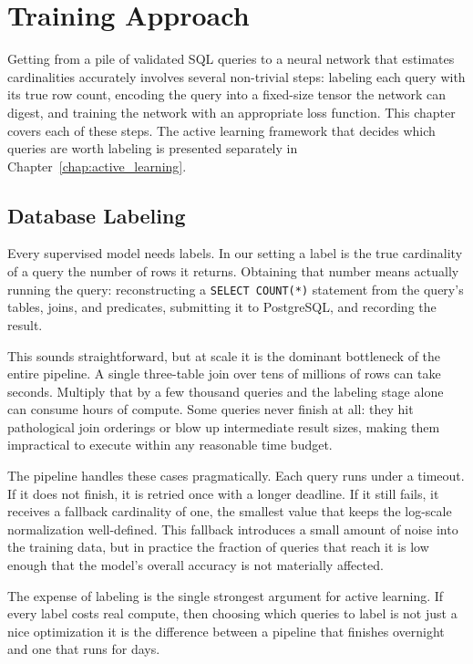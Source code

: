 \chapter{Training Approach}
\label{chap:training_approach}
\pagestyle{plain}

Getting from a pile of validated SQL queries to a neural network that estimates cardinalities accurately involves several non-trivial steps: labeling each query with its true row count, encoding the query into a fixed-size tensor the network can digest, and training the network with an appropriate loss function. This chapter covers each of these steps. The active learning framework that decides which queries are worth labeling is presented separately in Chapter~\ref{chap:active_learning}.


\section{Database Labeling}

Every supervised model needs labels. In our setting a label is the true cardinality of a query the number of rows it returns. Obtaining that number means actually running the query: reconstructing a \texttt{SELECT COUNT(*)} statement from the query's tables, joins, and predicates, submitting it to PostgreSQL, and recording the result.

This sounds straightforward, but at scale it is the dominant bottleneck of the entire pipeline. A single three-table join over tens of millions of rows can take seconds. Multiply that by a few thousand queries and the labeling stage alone can consume hours of compute. Some queries never finish at all: they hit pathological join orderings or blow up intermediate result sizes, making them impractical to execute within any reasonable time budget.

The pipeline handles these cases pragmatically. Each query runs under a timeout. If it does not finish, it is retried once with a longer deadline. If it still fails, it receives a fallback cardinality of one, the smallest value that keeps the log-scale normalization well-defined. This fallback introduces a small amount of noise into the training data, but in practice the fraction of queries that reach it is low enough that the model's overall accuracy is not materially affected.

The expense of labeling is the single strongest argument for active learning. If every label costs real compute, then choosing which queries to label is not just a nice optimization it is the difference between a pipeline that finishes overnight and one that runs for days.


